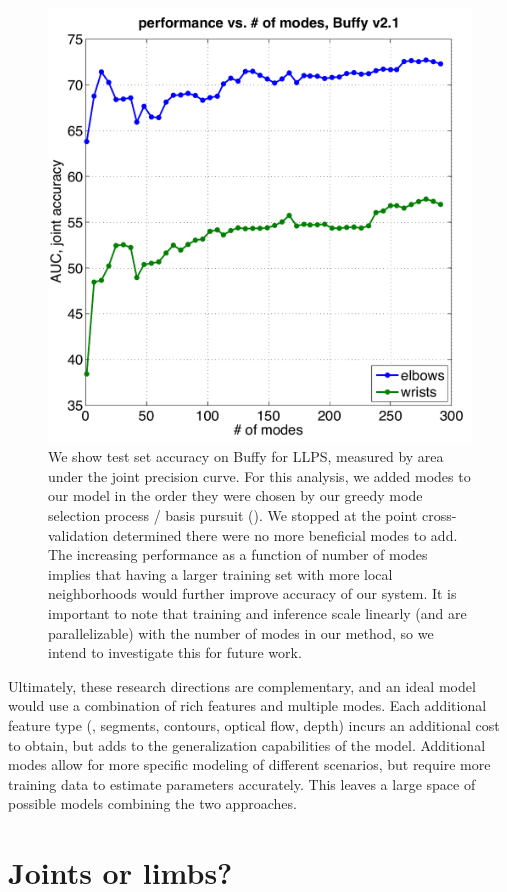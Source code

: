 \begin{figure}[htb!]
\centering
\includegraphics[width=0.59\linewidth]{figs/llps-learning-curve.pdf}
\caption[Test accuracy versus number of local neighborhood modes in LLPS.]{
\label{fig:llps-learning-curve} We show test set accuracy on Buffy for LLPS, 
measured by area under the joint precision curve.  For this analysis, we added 
modes to our model in the order they were chosen by our greedy mode selection 
process / basis pursuit ().  We stopped at the point 
cross-validation determined there were no more beneficial modes to add. The 
increasing performance as a function of number of modes implies that having a 
larger training set with more local neighborhoods would further improve 
accuracy of our system.  It is important to note that training and inference 
scale linearly (and are parallelizable) with the number of modes in our method, 
so we intend to investigate this for future work.}
\end{figure}


Ultimately, these research directions are complementary, and an ideal model 
would use a combination of rich features and multiple modes. Each additional 
feature type (\eg, segments, contours, optical flow, depth) incurs an 
additional cost to obtain, but adds to the generalization capabilities of the 
model. Additional modes allow for more specific modeling of different 
scenarios, but require more training data to estimate parameters accurately.  
This leaves a large space of possible models combining the two approaches.

\section{Joints or limbs?}

